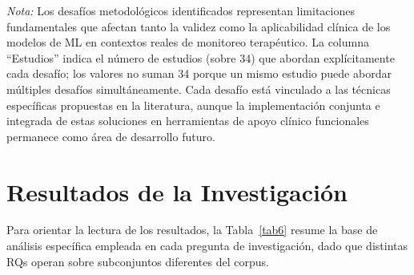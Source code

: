 \documentclass[ASNA,twocolumn]{USG}
\begin{document}
\begin{table}[!t]
\begin{tablenotes}
			\item {\it Nota:} Los desafíos metodológicos identificados representan limitaciones fundamentales que afectan tanto la validez como la aplicabilidad clínica de los modelos de ML en contextos reales de monitoreo terapéutico. La columna ``Estudios'' indica el número de estudios (sobre 34) que abordan explícitamente cada desafío; los valores no suman 34 porque un mismo estudio puede abordar múltiples desafíos simultáneamente. Cada desafío está vinculado a las técnicas específicas propuestas en la literatura, aunque la implementación conjunta e integrada de estas soluciones en herramientas de apoyo clínico funcionales permanece como área de desarrollo futuro.
		\end{tablenotes}
	\end{table}
	
	\section{Resultados de la Investigación}\label{sec4}
	
	Para orientar la lectura de los resultados, la Tabla~\ref{tab6} resume la base
	de análisis específica empleada en cada pregunta de investigación, dado que
	distintas RQs operan sobre subconjuntos diferentes del corpus.
	
\end{document}
